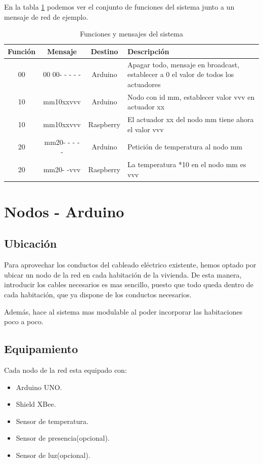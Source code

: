 En la tabla \ref{tab:funcSistema} podemos ver el conjunto de funciones del sistema junto a un mensaje de red de ejemplo.


\begin{table}[h]
    \centering
    \begin{tabular}{cccp{6cm}}
        
        Función & Mensaje   & Destino & Descripción     \\ \toprule
        00      & 00 00- - - - -& Arduino & Apagar todo, mensaje en broadcast, establecer a 0 el valor de todos los actuadores \\ \midrule
        10      & mm10xxvvv & Arduino & Nodo con id mm, establecer valor vvv en actuador xx\\ \midrule
        10      & mm10xxvvv & Raspberry & El actuador xx del nodo mm tiene ahora el valor vvv \\ \midrule
        20      & mm20- - - - - & Arduino &  Petición de temperatura al nodo mm \\ \midrule
        20      & mm20- -vvv & Raspberry &  La temperatura *10 en el nodo mm es vvv \\ \midrule            
    \end{tabular}
    \caption{Funciones y mensajes del sistema}
    \label{tab:funcSistema}
\end{table} 



\section{Nodos - Arduino}
\subsection{Ubicación}
Para aprovechar los conductos del cableado eléctrico existente, hemos optado por ubicar un nodo de la red en cada habitación de la vivienda. De esta manera, introducir los cables necesarios es mas sencillo, puesto que todo queda dentro de cada habitación, que ya dispone de los conductos necesarios.

 Además, hace al sistema mas modulable al poder incorporar las habitaciones poco a poco.

\subsection{Equipamiento}
Cada nodo de la red esta equipado con:
\begin{itemize}
    \item Arduino UNO.
    \item Shield XBee.
    \item Sensor de temperatura.
    \item Sensor de presencia(opcional).
    \item Sensor de luz(opcional).
\end{itemize}


